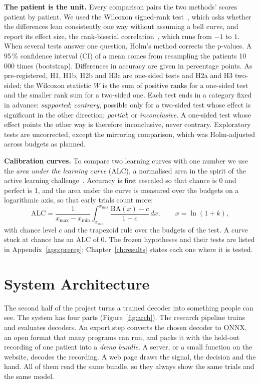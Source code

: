 \textbf{The patient is the unit.} Every comparison pairs the two methods' scores patient
by patient. We used the Wilcoxon signed-rank test~\cite{wilcoxon1945}, which asks whether
the differences lean consistently one way without assuming a bell curve, and report its
effect size, the rank-biserial correlation~\cite{kerby2014}, which runs from $-1$ to $1$.
When several tests answer one question, Holm's method corrects the p-values. A 95\,\%
confidence interval (CI) of a mean comes from resampling the patients 10\,000 times
(bootstrap). Differences in accuracy are given in percentage points. As pre-registered,
H1, H1b, H2b and H3c are one-sided tests and H2a and H3 two-sided; the Wilcoxon statistic
$W$ is the sum of positive ranks for a one-sided test and the smaller rank sum for a
two-sided one. Each test ends in a category fixed in advance: \emph{supported};
\emph{contrary}, possible only for a two-sided test whose effect is significant in the
other direction; \emph{partial}; or \emph{inconclusive}. A one-sided test whose effect
points the other way is therefore inconclusive, never contrary. Exploratory tests are
uncorrected, except the mirroring comparison, which was Holm-adjusted across budgets as
planned.

\textbf{Calibration curves.} To compare two learning curves with one number we use the
\emph{area under the learning curve} (ALC), a normalised area in the spirit of the
active learning challenge~\cite{guyon2011}. Accuracy is first rescaled so that chance is
0 and perfect is 1, and the area under the curve is measured over the budgets on a
logarithmic axis, so that early trials count more:
\begin{equation}
  \mathrm{ALC} = \frac{1}{x_{\max} - x_{\min}} \int_{x_{\min}}^{x_{\max}}
  \frac{\mathrm{BA}(x) - c}{1 - c}\, dx, \qquad x = \ln(1 + k),
\end{equation}
with chance level $c$ and the trapezoid rule over the budgets of the test. A curve stuck
at chance has an ALC of 0. The frozen hypotheses and their tests are listed in Appendix~\ref{app:prereg}; Chapter~\ref{ch:results}
states each one where it is tested.


\section{System Architecture}\label{sec:arch}

The second half of the project turns a trained decoder into something people can see.
The system has four parts (Figure~\ref{fig:arch}). The research pipeline trains and
evaluates decoders. An export step converts the chosen decoder to ONNX, an open format
that many programs can run, and packs it with the held-out recording of one patient into a
\emph{demo bundle}. A server, or a small function on the website, decodes the recording. A
web page draws the signal, the decision and the hand. All of them read the same bundle, so
they always show the same trials and the same model.

